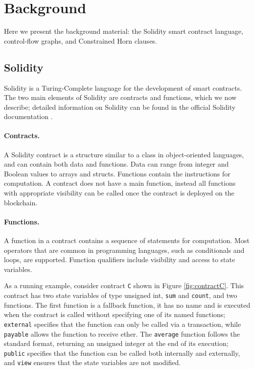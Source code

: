 \section{Background}

Here we present the background material: the Solidity smart contract language,
control-flow graphs, and Constrained Horn clauses.


\subsection{Solidity} \label{sec:background_sol}

Solidity is a Turing-Complete language for the development of smart contracts.
The two main elements of Solidity are contracts and functions, which we now
describe; detailed information on Solidity can be found in the official
Solidity documentation \cite{SolidityDocs}.

\paragraph{Contracts.} A Solidity contract is a structure similar to a class in
object-oriented languages, and can contain both data and functions.
%
Data can range from integer and Boolean values to arrays and structs.
%
Functions contain the instructions for computation.
%
A contract does not have a main function, instead all functions with
appropriate visibility can be called once the contract is deployed on the
blockchain.

\paragraph{Functions.} A function in a contract contains a sequence of
statements for computation.
%
Most operators that are common in programming languages, such as conditionals
and loops, are supported.
%
Function qualifiers include visibility and access to state variables. 

As a running example, consider contract \texttt{C} shown in Figure
\ref{fig:contractC}. This contract has two state variables of type unsigned
int, \texttt{sum} and \texttt{count}, and two functions. The first function is
a fallback function, it has no name and is executed when the contract is called
without specifying one of its named functions; \texttt{external} specifies that
the function can only be called via a transaction, while \texttt{payable}
allows the function to receive ether. The \texttt{average} function follows the
standard format, returning an unsigned integer at the end of its execution;
\texttt{public} specifies that the function can be called both internally and
externally, and \texttt{view} ensures that the state variables are not
modified.

